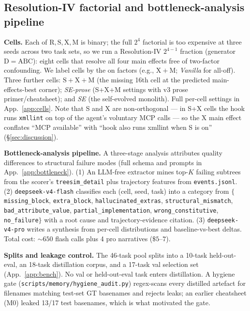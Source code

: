 \documentclass{article}
\begin{document}
\subsection{Resolution-IV factorial and bottleneck-analysis pipeline}
\label{subsec:cells}

\textbf{Cells.} Each of $\mathrm{R, S, X, M}$ is binary; the full $2^4$ factorial is too expensive at three seeds across two task sets, so we run a Resolution-IV $2^{4-1}$ fraction (generator $\mathrm{D}{=}\mathrm{ABC}$): eight cells that resolve all four main effects free of two-factor confounding. We label cells by the on factors (e.g., $\mathrm{X+M}$; \emph{Vanilla} for all-off). Three further cells: $\mathrm{S+X+M}$ (the missing 16th cell at the predicted main-effects-best corner); \emph{SE-prose} (S+X+M settings with v3 prose primer/cheatsheet); and \emph{SE} (the self-evolved monolith). Full per-cell settings in App.~\ref{app:cells}. Note that S and X are non-orthogonal --- in S+X cells the hook runs \texttt{xmllint} on top of the agent's voluntary MCP calls --- so the X main effect conflates ``MCP available'' with ``hook also runs xmllint when S is on'' (\S\ref{sec:discussion}).

\textbf{Bottleneck-analysis pipeline.} A three-stage analysis attributes quality differences to structural failure modes (full schema and prompts in App.~\ref{app:bottleneck}). (1) An LLM-free extractor mines top-$K$ failing subtrees from the scorer's \texttt{treesim\_detail} plus trajectory features from \texttt{events.jsonl}. (2) \texttt{deepseek-v4-flash} classifies each (cell, seed, task) into a category from $\{$\texttt{missing\_block}, \texttt{extra\_block}, \texttt{hallucinated\_extras}, \texttt{structural\_mismatch}, \texttt{bad\_attribute\_value}, \texttt{partial\_implementation}, \texttt{wrong\_constitutive}, \texttt{no\_failure}$\}$ with a root cause and trajectory-evidence citation. (3) \texttt{deepseek-v4-pro} writes a synthesis from per-cell distributions and baseline-vs-best deltas. Total cost: ${\sim}650$ flash calls plus 4 pro narratives ($\$5\text{--}7$).

\textbf{Splits and leakage control.} The 46-task pool splits into a 10-task held-out-eval, an 18-task distillation corpus, and a 17-task val selection set (App.~\ref{app:bench}). No val or held-out-eval task enters distillation. A hygiene gate (\texttt{scripts/memory/hygiene\_audit.py}) regex-scans every distilled artefact for filenames matching test-set GT basenames and rejects leaks; an earlier cheatsheet (M0) leaked 13/17 test basenames, which is what motivated the gate.
\end{document}
